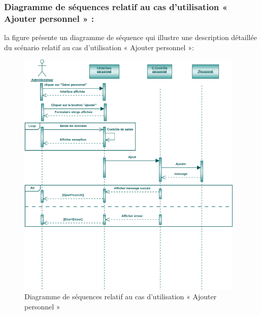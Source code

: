\documentclass[12 pt]{report}
\begin{document}
\subsubsection{Diagramme de séquences relatif au cas d’utilisation « Ajouter personnel » :}
la figure   présente un diagramme de séquence qui illustre une description détaillée du scénario relatif au cas d’utilisation «  Ajouter personnel »: 
{\begin{figure}[h]
 \begin{center}
\includegraphics[width= 14 cm ,height=  12cm]{sap.PNG}
\caption{Diagramme de séquences relatif au cas d’utilisation « Ajouter personnel  »}

\end{center}
\end{figure}}
\newpage
\end{document}
